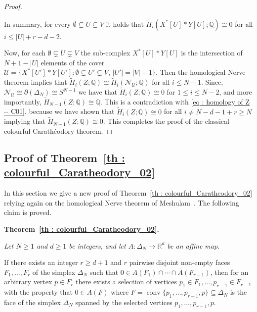 \documentclass[a4paper,11pt,reqno, english]{amsart}
\theoremstyle{definition}
\theoremstyle{remark}
\newcommand\R{\mathbb R}
\newcommand\Q{\mathbb Q}
\newcommand\NN{\mathscr N}
\newcommand\U{\mathscr U}
\DeclareMathOperator{\conv}{\mathrm{conv}}
\begin{document}
\begin{proof}
\begin{compactenum}[\quad\rm (1)]
	\end{compactenum}
	In summary, for every $\emptyset \subsetneq  U \subsetneq  V$ it holds that $\widetilde{H}_i(X^*[U]*Y[U];\Q)\cong 0$ for all $i\leq |U|+r-d-2$.

	\medskip
	Now, for each  $\emptyset \subsetneq  U \subsetneq  V$ the sub-complex $X^*[U]*Y[U]$ is the intersection of $N+1-|U|$ elements of the cover $\U=\{X^*[U']*Y[U'] : \emptyset\subsetneq U' \subsetneq V,\, |U'|=|V|-1\}$.
	Then the homological Nerve theorem  \cite[Thm.\,2.1]{Meshulam2001} implies that $\widetilde{H}_i(Z;\Q)\cong\widetilde{H}_i(\NN_{\U};\Q)$ for all $i\leq N-1$.
	Since, $\NN_{\U}\cong\partial ( \Delta_{N})\cong S^{N-1}$ we have that
	$\widetilde{H}_i(Z;\Q)\cong 0$
	for $1\leq i\leq N-2$, and more importantly, $\widetilde{H}_{N-1}(Z;\Q)\cong \Q$.
	This is a contradiction with \eqref{eq : homology of Z -- C01}, because we have shown that $\widetilde{H}_{i}(Z;\Q)\cong 0$ for all $i\neq N-d-1+r\geq N$ implying that $\widetilde{H}_{N-1}(Z;\Q)\cong 0$.
	This completes the proof of the classical colourful Carath\'eodory theorem.
\end{proof}


\subsection{Proof of Theorem~\ref{th : colourful_Caratheodory_02}}
\label{subsec : colourful Caratheodory's theorem 02}
\medskip

In this section we give a new proof of Theorem~\ref{th : colourful_Caratheodory_02} relying again on the homological Nerve theorem of Meshulam~\cite[Thm.\,2.1]{Meshulam2001}.
The following claim is proved.

\medskip\noindent
{\bf Theorem~\ref{th : colourful_Caratheodory_02}.}
{\em
Let $N\geq 1$ and $d\geq 1$ be integers, and let $A\colon \Delta_N\longrightarrow\R^d$ be an affine map.

\smallskip\noindent
If there exists an integer $r\geq d+1$ and $r$ pairwise disjoint non-empty faces $F_1,\dots, F_{r}$ of the simplex $\Delta_N$ such that
$
	0\in A(F_1)\cap\cdots\cap A(F_{r-1})
$,
then for an arbitrary vertex $p\in F_r$ there exists a selection of vertices $p_1\in F_1,\dots, p_{r-1}\in F_{r-1}$ with the property that $0\in A(F)$ where $F=\conv\{p_1,\dots,p_{r-1},p\}\subseteq\Delta_N$ is the face of the simplex $\Delta_N$ spanned by the selected vertices $p_1,\dots,p_{r-1},p$.
}
\end{document}

